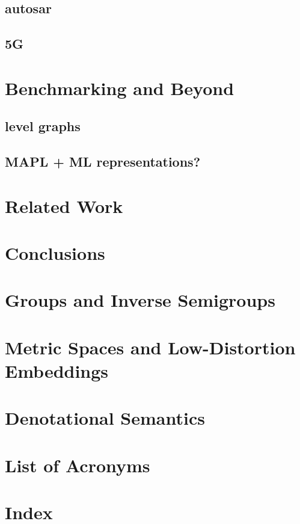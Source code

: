 \documentclass{report}
\begin{document}
\section{autosar}
\section{5G}

\chapter{Benchmarking and Beyond}
\section{level graphs}
\section{MAPL + ML representations?}

\chapter{Related Work}


\chapter{Conclusions} 

\appendix
\chapter{Groups and Inverse Semigroups}
\label{appendix:groups}

\chapter{Metric Spaces and Low-Distortion Embeddings}
\label{appendix:metric}

\chapter{Denotational Semantics}
\label{appendix:semantics}





\chapter*{List of Acronyms}
\begin{acronym}

\end{acronym}
\clearpage

\listoffigures

\chapter*{Index} 
\printindex
\end{document}
